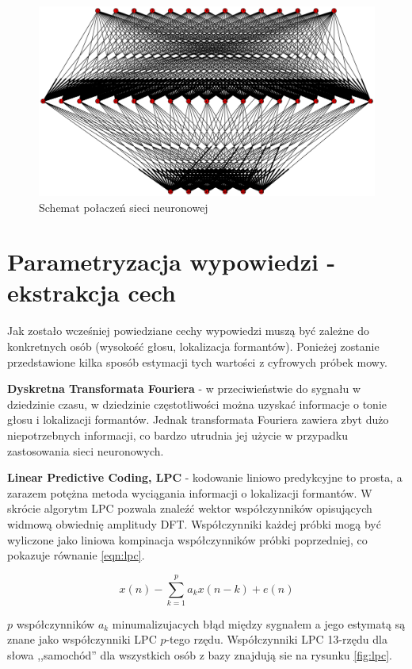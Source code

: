 \documentclass[a4paper]{article}
\begin{document}
\begin{figure}
    \includegraphics[width=\textwidth]{network}
    \caption{Schemat połaczeń sieci neuronowej}
    \label{fig:network}
\end{figure}

\section{Parametryzacja wypowiedzi - ekstrakcja cech}

Jak zostało wcześniej powiedziane cechy wypowiedzi muszą być zależne do
konkretnych osób (wysokość głosu, lokalizacja formantów). Ponieżej zostanie
przedstawione kilka sposób estymacji tych wartości z cyfrowych próbek mowy.

\textbf{Dyskretna Transformata Fouriera} - w przeciwieństwie do sygnału w
dziedzinie czasu, w dziedzinie częstotliwości można uzyskać informacje o tonie
głosu i lokalizacji formantów. Jednak transformata Fouriera zawiera zbyt dużo
niepotrzebnych informacji, co bardzo utrudnia jej użycie w przypadku
zastosowania sieci neuronowych.

\textbf{Linear Predictive Coding, LPC} - kodowanie liniowo predykcyjne to
prosta, a zarazem potężna metoda wyciągania informacji o lokalizacji formantów.
W skrócie algorytm LPC pozwala znaleźć wektor współczynników opisujących
widmową obwiednię amplitudy DFT. Współczynniki każdej próbki mogą być wyliczone
jako liniowa kompinacja współczynników próbki poprzedniej, co pokazuje równanie
\ref{eqn:lpc}.

\begin{equation}\label{eqn:lpc}
    x(n) - \sum_{k=1}^p a_k x(n-k) + e(n)
\end{equation}

$p$ współczynników $a_k$ minumalizujacych błąd między sygnałem a jego estymatą
są znane jako współczynniki LPC $p$-tego rzędu. Współczynniki LPC 13-rzędu dla
słowa ,,samochód'' dla wszystkich osób z bazy znajdują sie na rysunku
\ref{fig:lpc}.
\end{document}
